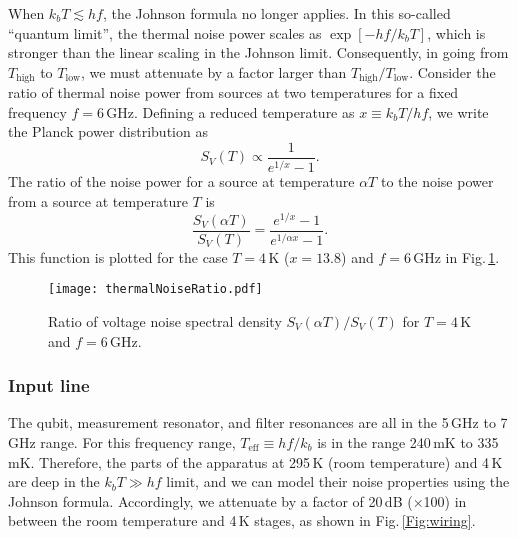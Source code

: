 When $k_b T \lesssim h f$, the Johnson formula no longer applies.
In this so-called ``quantum limit'', the thermal noise power scales as $\exp \left[ -hf / k_b T \right]$, which is stronger than the linear scaling in the Johnson limit.
Consequently, in going from $T_{\text{high}}$ to $T_{\text{low}}$, we must attenuate by a factor larger than $T_{\text{high}} / T_{\text{low}}$.
Consider the ratio of thermal noise power from sources at two temperatures for a fixed frequency $f=6\,\text{GHz}$.
Defining a reduced temperature as $x \equiv k_b T / hf$, we write the Planck power distribution as \begin{equation}
S_V(T) \propto \frac{1}{e^{1/x}-1} . \end{equation}
The ratio of the noise power for a source at temperature $\alpha T$ to the noise power from a source at temperature $T$ is
\begin{equation}
\frac{S_V(\alpha T)}{S_V(T)} = \frac{e^{1 / x} - 1}{e^{1 / \alpha x} - 1} . \end{equation}
This function is plotted for the case $T=4\,\text{K}$ ($x=13.8$) and $f=6\,\text{GHz}$ in Fig.\,\ref{Fig:ch:setup:sec:wiring:thermalNoiseRatio}.

\begin{figure}
\begin{centering}
\texttt{[image: thermalNoiseRatio.pdf]} 
\par\end{centering}
\caption{Ratio of voltage noise spectral density $S_V(\alpha T) / S_V(T)$ for $T=4\,\text{K}$ and $f=6\,\text{GHz}$.}
\label{Fig:ch:setup:sec:wiring:thermalNoiseRatio}
\end{figure}

\subsubsection{Input line}

The qubit, measurement resonator, and filter resonances are all in the 5\,GHz to 7\,GHz range.
For this frequency range, $T_{\text{eff}} \equiv h f / k_b$ is in the range 240\,mK to 335\,mK.
Therefore, the parts of the apparatus at 295\,K (room temperature) and 4\,K are deep in the $k_b T \gg h f$ limit, and we can model their noise properties using the Johnson formula.
Accordingly, we attenuate by a factor of 20\,dB ($\times$100) in between the room temperature and 4\,K stages, as shown in Fig.\,\ref{Fig:wiring}.

